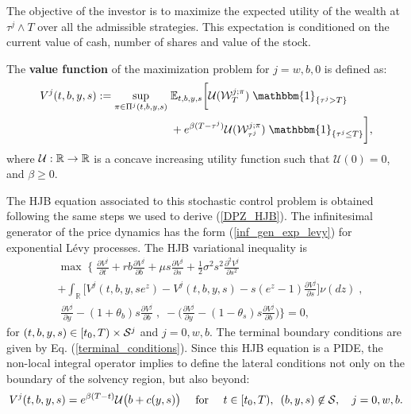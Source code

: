 The objective of the investor is to maximize the expected utility of the wealth at $\tau^j \wedge T$ over all the admissible
strategies. This expectation is conditioned on the current value of cash, number of shares and value of the
stock.
\begin{Definition}
 The \textbf{value function} of the maximization problem for $j=w,b,0$ is defined as:
\begin{align}\label{max_probl1}
V^j(t,b,y,s) := \sup_{\pi \in \Pi^j(t,b,y,s)} \; & \E_{t,b,y,s}\biggl[ 
            \mathcal{U}(\mathcal{W}^{j; \pi}_T) \; \mathbbm{1}_{\{\tau^j > T\}} \\ \nonumber
             &+ e^{ \beta (T-\tau^j)} \mathcal{U}( \mathcal{W}^{j; \pi}_{\tau^j} ) \; 
             \mathbbm{1}_{\{\tau^j \leq T\}}\biggr],             
\end{align}
where $\mathcal{U}: \mathbb{R} \to \mathbb{R}$ is a concave increasing utility function such that $\mathcal{U}(0)=0$, and $\beta \geq 0$.
\end{Definition}

The HJB equation associated to this stochastic control problem is obtained following the same steps we used to derive (\ref{DPZ_HJB}). The infinitesimal generator of the price 
dynamics has the 
form (\ref{inf_gen_exp_levy}) for exponential Lévy processes. The HJB variational inequality is
\begin{align}\label{HJB1}
& \max \; \biggl\{ \; \frac{\partial V^j}{\partial t} + rb\frac{\partial V^j}{\partial b} 
+ \mu s \frac{\partial V^j}{\partial s} + \frac{1}{2}\sigma^2 s^2 \frac{\partial^2 V^j}{\partial s^2} \\ \nonumber
&+ \int_\mathbb{R}
\biggl[ V^j(t,b,y,se^z) - V^j(t,b,y,s) - s(e^z-1)\frac{\partial V^j}{\partial s} \biggr] \nu(dz) \;,\\ \nonumber
& \;  \frac{\partial V^j}{\partial y}-(1+\theta_b) s \frac{\partial V^j}{\partial b} \; 
, \; -\biggl(\frac{\partial V^j}{\partial y}-(1-\theta_s)s \frac{\partial V^j}{\partial b} \biggr) \biggr\} = 0, 
 \end{align}
for $(t,b,y,s) \in [t_0,T) \times \mathcal{S}^j$ and $j=0,w,b$.   
The terminal boundary conditions are given by Eq. (\ref{terminal_conditions}).
Since this HJB equation is a PIDE,
the non-local integral operator implies to 
define the lateral conditions not only on the boundary
of the solvency region, but also beyond:
\begin{equation}\label{lat_bound}
V^j(t,b,y,s) = e^{ \beta (T-t)} \mathcal{U}\bigl( b + c(y,s)\bigr) \hspace{1em} \mbox{ for } \hspace{1em} 
t \in [t_0,T) , \hspace{0.5em} (b,y,s) \not \in \mathcal{S}, \hspace{1em} j=0,w,b. 
\end{equation}


